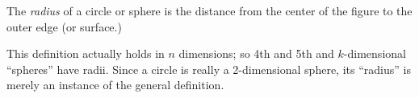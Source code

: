 \documentclass[12pt]{article}
\begin{document}
The \emph{radius} of a circle or sphere is the distance from the center of the figure to the outer edge (or surface.)  

This definition actually holds in $n$ dimensions; so 4th and 5th and $k$-dimensional ``spheres'' have radii.  Since a circle is really a 2-dimensional sphere, its ``radius'' is merely an instance of the general definition.
\end{document}
